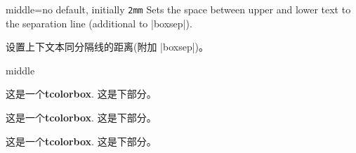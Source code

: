 \begin{docTcbKey}{middle}{=}{no default, initially \texttt{2mm}}
Sets the space between upper and lower text to the separation line
(additional to |boxsep|).


设置上下文本同分隔线的距离(附加 |boxsep|)。
\begin{exdispExample}{middle}

\begin{tcolorbox}[middle=0mm,boxsep=0mm]
这是一个\textbf{tcolorbox}.
\tcblower
这是下部分。
\end{tcolorbox}
\begin{tcolorbox}[boxsep=0mm]
这是一个\textbf{tcolorbox}.
\tcblower
这是下部分。
\end{tcolorbox}
\begin{tcolorbox}
这是一个\textbf{tcolorbox}.
\tcblower
这是下部分。
\end{tcolorbox}
\end{exdispExample}
\end{docTcbKey}

